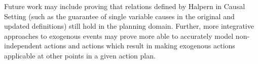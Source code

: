 \documentclass{article}
\theoremstyle{plain}
\theoremstyle{definition}
\begin{document}
Future work may include proving that relations defined by Halpern in Causal Setting (such as the guarantee of single variable causes in the original and updated definitions) still hold in the planning domain. Further, more integrative approaches to exogenous events may prove more able to accurately model non-independent actions and actions which result in making exogenous actions applicable at other points in a given action plan.








 
\end{document}
